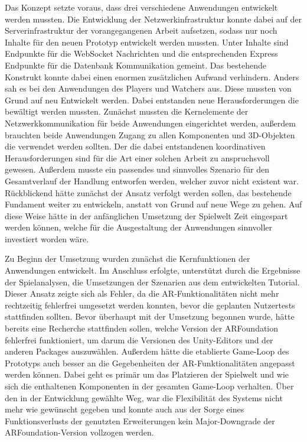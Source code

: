 Das Konzept setzte voraus, dass drei verschiedene Anwendungen entwickelt werden mussten. Die Entwicklung der Netzwerkinfrastruktur konnte dabei auf der Serverinfrastruktur der vorangegangenen Arbeit aufsetzen, sodass nur noch Inhalte für den neuen Prototyp entwickelt werden mussten. Unter Inhalte sind Endpunkte für die WebSocket Nachrichten und die entsprechenden Express Endpunkte für die Datenbank Kommunikation gemeint. Das bestehende Konstrukt konnte dabei einen enormen zusätzlichen Aufwand verhindern. Anders sah es bei den Anwendungen des Players und Watchers aus. Diese mussten von Grund auf neu Entwickelt werden. Dabei entstanden neue Herausforderungen die bewältigt werden mussten. Zunächst mussten die Kernelemente der Netzwerkkommunikation für beide Anwendungen eingerichtet werden, außerdem brauchten beide Anwendungen Zugang zu allen Komponenten und \ac{3D}-Objekten die verwendet werden sollten. Der die dabei entstandenen koordinativen Herausforderungen sind für die Art einer solchen Arbeit zu anspruchsvoll gewesen. Außerdem musste ein passendes und sinnvolles Szenario für den Gesamtverlauf der Handlung entworfen werden, welcher zuvor nicht existent war. Rückblickend hätte zunächst der Ansatz verfolgt werden sollen, das bestehende Fundament weiter zu entwickeln, anstatt von Grund auf neue Wege zu gehen. Auf diese Weise hätte in der anfänglichen Umsetzung der Spielwelt Zeit eingespart werden können, welche für die Ausgestaltung der Anwendungen sinnvoller investiert worden wäre.

Zu Beginn der Umsetzung wurden zunächst die Kernfunktionen der Anwendungen entwickelt. Im Anschluss erfolgte, unterstützt durch die Ergebnisse der Spielanalysen, die Umsetzungen der Szenarien aus dem entwickelten Tutorial. Dieser Ansatz zeigte sich als Fehler, da die \ac{AR}-Funktionalitäten nicht mehr rechtzeitig fehlerfrei umgesetzt werden konnten, bevor die geplanten Nutzertests stattfinden sollten. Bevor überhaupt mit der Umsetzung begonnen wurde, hätte bereits eine Recherche stattfinden sollen, welche Version der ARFoundation fehlerfrei funktioniert, um darum die Versionen des Unity-Editors und der anderen Packages auszuwählen. Außerdem hätte die etablierte Game-Loop des Prototyps auch besser an die Gegebenheiten der \ac{AR}-Funktionalitäten angepasst werden können. Dabei geht es primär um das Platzieren der Spielwelt und wie sich die enthaltenen Komponenten in der gesamten Game-Loop verhalten. Über den in der Entwicklung gewählte Weg, war die Flexibilität des Systems nicht mehr wie gewünscht gegeben und konnte auch aus der Sorge eines Funktionsverlusts der genutzten Erweiterungen kein Major-Downgrade der ARFoundation-Version vollzogen werden.

